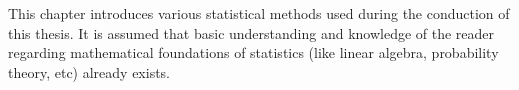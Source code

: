 This chapter introduces various statistical methods used during the conduction of this thesis. It is assumed that basic understanding and knowledge of the reader regarding mathematical foundations of statistics (like linear algebra, probability theory, etc) already exists.